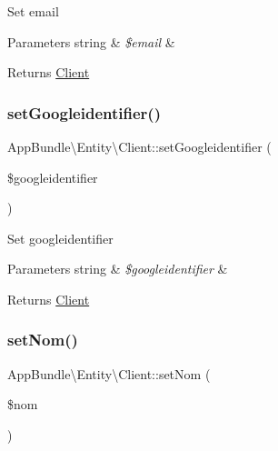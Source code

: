 Set email


\begin{DoxyParams}[1]{Parameters}
string & {\em \$email} & \\
\hline
\end{DoxyParams}
\begin{DoxyReturn}{Returns}
\hyperlink{class_app_bundle_1_1_entity_1_1_client}{Client} 
\end{DoxyReturn}
\mbox{\label{class_app_bundle_1_1_entity_1_1_client_a2447045598aab2e13a42871d674dd0be}} 
\subsubsection{\texorpdfstring{set\+Googleidentifier()}{setGoogleidentifier()}}
{\footnotesize\ttfamily App\+Bundle\textbackslash{}\+Entity\textbackslash{}\+Client\+::set\+Googleidentifier (\begin{DoxyParamCaption}\item[{}]{\$googleidentifier }\end{DoxyParamCaption})}

Set googleidentifier


\begin{DoxyParams}[1]{Parameters}
string & {\em \$googleidentifier} & \\
\hline
\end{DoxyParams}
\begin{DoxyReturn}{Returns}
\hyperlink{class_app_bundle_1_1_entity_1_1_client}{Client} 
\end{DoxyReturn}
\mbox{\label{class_app_bundle_1_1_entity_1_1_client_aec8368cf77fcb71653d5ae4febdd782e}} 
\subsubsection{\texorpdfstring{set\+Nom()}{setNom()}}
{\footnotesize\ttfamily App\+Bundle\textbackslash{}\+Entity\textbackslash{}\+Client\+::set\+Nom (\begin{DoxyParamCaption}\item[{}]{\$nom }\end{DoxyParamCaption})}

